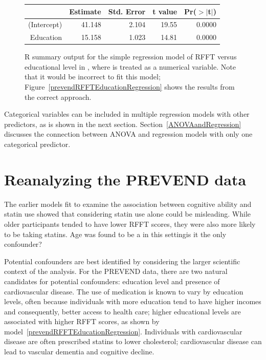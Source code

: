 \begin{figure}[ht]
	\centering
	\begin{tabular}{rrrrr}
		\hline
		& Estimate & Std. Error & t value & Pr($>$$|$t$|$) \\ 
		\hline
		(Intercept) & 41.148 & 2.104 & 19.55 & 0.0000 \\ 
		Education & 15.158 & 1.023 & 14.81 & 0.0000 \\ 
		\hline
	\end{tabular}
	\caption{\textsf{R} summary output for the simple regression model of RFFT versus educational level in , where  is treated as a numerical variable. Note that it would be incorrect to fit this model; Figure~\ref{prevendRFFTEducationRegression} shows the results from the correct approach.} 
	\label{prevendRFFTEducationNumRegression}
\end{figure}
		
Categorical variables can be included in multiple regression models with other predictors, as is shown in the next section. Section~\ref{ANOVAandRegression} discusses the connection between ANOVA and regression models with only one categorical predictor.



\section{Reanalyzing the PREVEND data}
\label{reanalyzingStatinDataSet}


The earlier models fit to examine the association between cognitive ability and statin use showed that considering statin use alone could be misleading. While older participants tended to have lower RFFT scores, they were also more likely to be taking statins. Age was found to be a  in this setting\textemdash is it the only confounder?

Potential confounders are best identified by considering the larger scientific context of the analysis. For the PREVEND data, there are two natural candidates for potential confounders: education level and presence of cardiovascular disease. The use of medication is known to vary by education levels, often because individuals with more education tend to have higher incomes and consequently, better access to health care; higher educational levels are associated with higher RFFT scores, as shown by model~\ref{prevendRFFTEducationRegression}. Individuals with cardiovascular disease are often prescribed statins to lower cholesterol; cardiovascular disease can lead to vascular dementia and cognitive decline.

